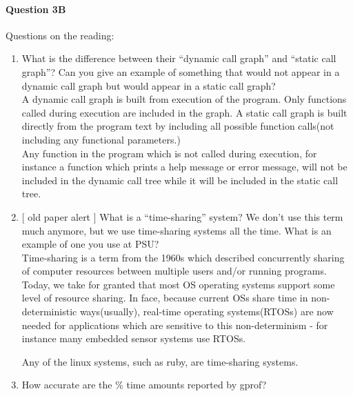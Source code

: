 \documentclass[11pt]{article}
\begin{document}
\paragraph{Question 3B} Questions on the reading:\\
\begin{enumerate}
\item What is the difference between their “dynamic call graph” and “static call graph”? Can you give an example of something that would not appear in a dynamic call graph but would appear in a static call graph? \\

A dynamic call graph is built from execution of the program. Only functions called during execution are included in the graph.  A static call graph is built directly from the program text by including all possible function calls(not including any functional parameters.)\\

Any function in the program which is not called during execution, for instance a function which prints a help message or error message, will not be included in the dynamic call tree while it will be included in the static call tree.\\

\item $[$ old paper alert $]$ What is a “time-sharing” system? We don’t use this term much anymore, but we use time-sharing systems all the time. What is an example of one you use at PSU?\\

Time-sharing is a term from the 1960s which described concurrently sharing of computer resources between multiple users and/or running programs. Today, we take for granted that most OS operating systems support some level of resource sharing.  In face, because current OSs share time in non-deterministic ways(usually), real-time operating systems(RTOSs) are now needed for applications which are sensitive to this non-determinism - for instance many embedded sensor systems use RTOSs.

Any of the linux systems, such as ruby, are time-sharing systems.

\item How accurate are the $\%$ time amounts reported by gprof?\\


\end{enumerate}
\end{document}
